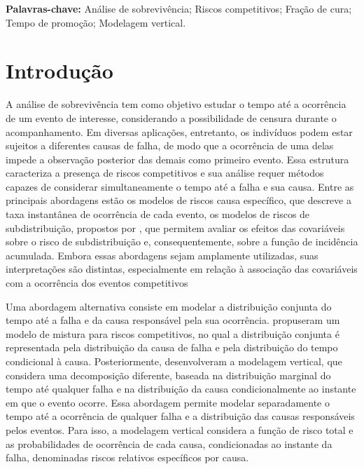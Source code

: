 \documentclass[11pt,a4paper]{article}
\begin{document}
\textbf{Palavras-chave:} Análise de sobrevivência; Riscos competitivos; Fração de cura; Tempo de promoção; Modelagem vertical.
\section{Introdução}

A análise de sobrevivência tem como objetivo estudar o tempo até a ocorrência de um evento de interesse, considerando a possibilidade de censura durante o acompanhamento. Em diversas aplicações, entretanto, os indivíduos podem estar sujeitos a diferentes causas de falha, de modo que a ocorrência de uma delas impede a observação posterior das demais como primeiro evento. Essa estrutura caracteriza a presença de riscos competitivos e sua análise requer métodos capazes de considerar simultaneamente o tempo até a falha e sua causa. Entre as principais abordagens estão os modelos de riscos causa específico, que descreve a taxa instantânea de ocorrência de cada evento, os modelos de riscos de subdistribuição, propostos por \cite{fine1999proportional}, que permitem avaliar os efeitos das covariáveis sobre o risco de subdistribuição e, consequentemente, sobre a função de incidência acumulada. Embora essas abordagens sejam amplamente utilizadas, suas interpretações são distintas, especialmente em relação à associação das covariáveis com a ocorrência dos eventos competitivos \citep{putter2007tutorial, andersen2012competing}

Uma abordagem alternativa consiste em modelar a distribuição conjunta do tempo até a falha e da causa responsável pela sua ocorrência. \citet{larson1985mixture} propuseram um modelo de mistura para riscos competitivos, no qual a distribuição conjunta é representada pela distribuição da causa de falha e pela distribuição do tempo condicional à causa. Posteriormente, \cite{nicolaie2010vertical} desenvolveram a modelagem vertical, que considera uma decomposição diferente, baseada na distribuição marginal do tempo até qualquer falha e na distribuição da causa condicionalmente ao instante em que o evento ocorre. Essa abordagem permite modelar separadamente o tempo até a ocorrência de qualquer falha e a distribuição das causas responsáveis pelos eventos. Para isso, a modelagem vertical considera a função de risco total e as probabilidades de ocorrência de cada causa, condicionadas ao instante da falha, denominadas riscos relativos específicos por causa.
\end{document}

